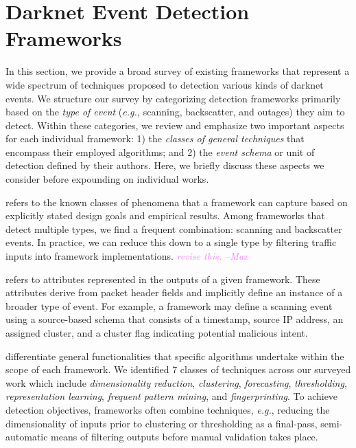 \documentclass[manuscript,nonacm]{acmart}
\newcommand{\maxnote}[1]{\textit{\textcolor{violet}{#1 --Max}}}
\begin{document}

\label{sec:frameworks}
\section{Darknet Event Detection Frameworks}

In this section, we provide a broad survey of existing frameworks that represent a wide spectrum of techniques proposed to detection various kinds of darknet events.
We structure our survey by categorizing detection frameworks primarily based on the \textit{type of event} (\textit{e.g.,} scanning, backscatter, and outages) 
they aim to detect. Within these categories, we review and emphasize two important aspects for each individual framework: 1) the \textit{classes of general techniques} that encompass their employed algorithms; 
and 2) the \textit{event schema} or unit of detection defined by their authors. 
Here, we briefly discuss these aspects we consider before expounding on individual works.

\vspace{0.25em}
 refers to the known classes of phenomena that a framework can capture based on explicitly stated design goals and empirical results.
Among frameworks that detect multiple types, we find a frequent combination: scanning and backscatter events.
In practice, we can reduce this down to a single type by filtering traffic inputs into framework implementations.
\maxnote{revise this.}


\vspace{0.25em}
 refers to attributes represented in the outputs of a given framework.
These attributes derive from packet header fields and implicitly define an instance of a broader type of event.
For example, a framework may define a scanning event using a source-based schema that consists of a timestamp, source IP address, an assigned cluster, and a cluster flag indicating potential malicious intent.

\vspace{0.25em}
 differentiate general functionalities that specific algorithms undertake within the scope of each framework.
We identified 7 classes of techniques across our surveyed work which include \textit{dimensionality reduction}, \textit{clustering}, \textit{forecasting}, \textit{thresholding}, \textit{representation learning},
\textit{frequent pattern mining}, and \textit{fingerprinting}. 
To achieve detection objectives, frameworks often combine techniques, \textit{e.g.}, reducing the dimensionality of inputs prior to clustering or 
thresholding as a final-pass, semi-automatic means of filtering outputs before manual validation takes place.
\end{document}
